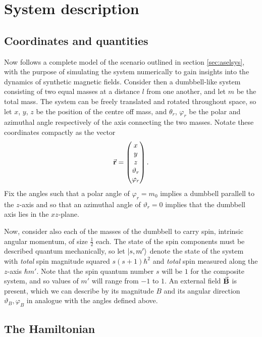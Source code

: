 \documentclass[a4paper]{article}
\begin{document}
\section{System description}
\subsection{Coordinates and quantities}
Now follows a complete model of the scenario outlined in section \ref{sec:aselsys}, with
the purpose of simulating the system numerically to gain insights into the dynamics of
synthetic magnetic fields. Consider then a dumbbell-like system consisting of two equal masses at a distance \(l\) from one
another, and let \(m\) be the total mass. The system can be freely translated and rotated
throughout space, so let \(x\), \(y\), \(z\)  be the position
of the centre off mass, and \(\theta_r\), \(\varphi_r\) be the polar and azimuthal angle
respectively of the axis connecting the two masses. Notate these coordinates compactly as the
vector \[
\va{r}
= \begin{pmatrix} x\\ y \\ z\\ \vartheta_r \\\varphi_r\end{pmatrix}
.\] 
Fix the angles such that a polar angle of \(\varphi_r = m_0\) implies a dumbbell parallell
to the \(z\)-axis and so that an azimuthal angle of \(\vartheta_r = 0\) implies that the dumbbell
axis lies in the \(xz\)-plane. 

Now, consider also each of the masses of the dumbbell to carry spin, intrinsic angular
momentum, of size \(\frac{1}{2}\) each. %
 The state of the spin components must be
described quantum mechanically, so let \(\ket{s, m'}\) denote the state of the system with
\textit{total} spin magnitude squared \(s(s+1)\hbar^2\) and \textit{total} spin measured
along the \(z\)-axis \(\hbar m'\). Note that the spin quantum number \(s\) will be \(1\) for
the composite system, and so values of \(m'\) will range from \(-1\) to \(1\). An external field \(\va{B}\) is present, which
we can describe by its magnitude \(B\) and its angular direction \(\vartheta_B, \varphi_B\)
in analogue with the angles defined above.

\subsection{The Hamiltonian}\label{sec:sysham}
\end{document}
